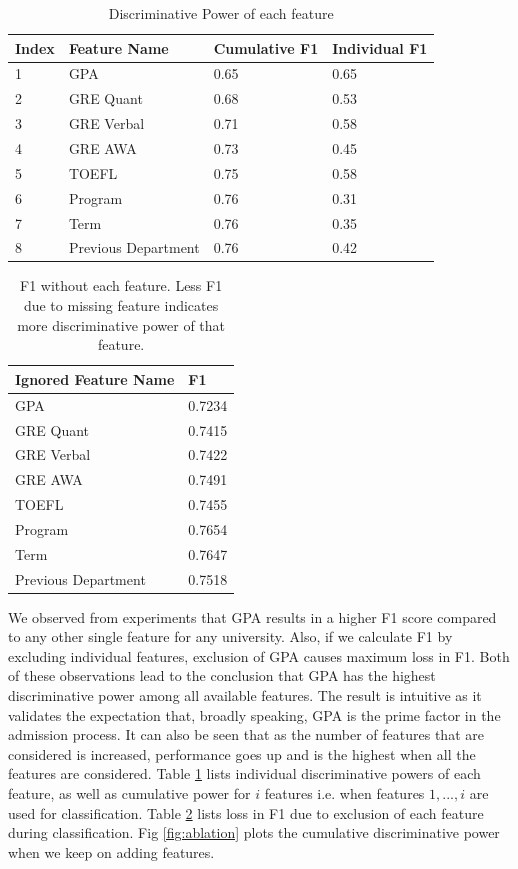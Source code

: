 \documentclass{sig-alternate-05-2015}
\begin{document}
\begin{table}[h]
\centering
\caption{Discriminative Power of each feature}
\label{tab:ablation}
\begin{tabular}{p{0.5 cm} p{2.5 cm} p{1.3 cm} p{1.3 cm}}\\
Index & Feature Name & Cumulative F1 & Individual F1 \\ \hline
1 & GPA & 0.65 & 0.65 \\ \hline
2 & GRE Quant & 0.68 & 0.53 \\ \hline
3 & GRE Verbal & 0.71 & 0.58 \\ \hline
4 & GRE AWA & 0.73 & 0.45 \\ \hline
5 & TOEFL & 0.75 & 0.58 \\ \hline
6 & Program & 0.76 & 0.31 \\ \hline
7 & Term & 0.76 & 0.35 \\ \hline
8 & Previous Department & 0.76 & 0.42 \\ \hline
\end{tabular}
\end{table}

\begin{table}[t]
\centering
\caption{F1 without each feature. Less F1 due to missing feature indicates more discriminative power of that feature.}
\label{tab:ablation-2}
\begin{tabular}{p{4.0 cm} p{1.3 cm}} \\
Ignored Feature Name & F1 \\ \hline
GPA & 0.7234 \\ \hline
GRE Quant & 0.7415 \\ \hline
GRE Verbal & 0.7422 \\ \hline
GRE AWA & 0.7491 \\ \hline
TOEFL & 0.7455 \\ \hline
Program & 0.7654 \\ \hline
Term & 0.7647 \\ \hline
Previous Department & 0.7518 \\ \hline
\end{tabular}
\end{table}

We observed from experiments that GPA results in a higher F1 score compared to any other single feature for any university. Also, if we calculate F1 by excluding individual features, exclusion of GPA causes maximum loss in F1. Both of these observations lead to the conclusion that GPA has the highest discriminative power among all available features. The result is intuitive as it validates the expectation that, broadly speaking, GPA is the prime factor in the admission process. It can also be seen that as the number of features that are considered is increased, performance goes up and is the highest when all the features are considered. Table \ref{tab:ablation} lists individual discriminative powers of each feature, as well as cumulative power for $i$ features i.e. when features ${1,...,i}$ are used for classification. Table \ref{tab:ablation-2} lists loss in F1 due to exclusion of each feature during classification. Fig \ref{fig:ablation} plots the cumulative discriminative power when we keep on adding features.
\end{document}
